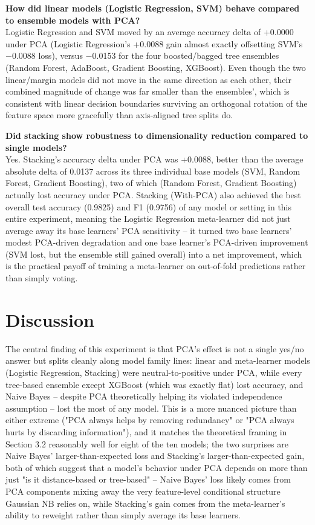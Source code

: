 \documentclass[11pt,a4paper]{article}
\begin{document}
\textbf{How did linear models (Logistic Regression, SVM) behave compared to ensemble models with PCA?}\\
Logistic Regression and SVM moved by an average accuracy delta of +0.0000 under PCA (Logistic Regression's +0.0088 gain almost exactly offsetting SVM's $-$0.0088 loss), versus $-$0.0153 for the four boosted/bagged tree ensembles (Random Forest, AdaBoost, Gradient Boosting, XGBoost). Even though the two linear/margin models did not move in the same direction as each other, their combined magnitude of change was far smaller than the ensembles', which is consistent with linear decision boundaries surviving an orthogonal rotation of the feature space more gracefully than axis-aligned tree splits do.

\textbf{Did stacking show robustness to dimensionality reduction compared to single models?}\\
Yes. Stacking's accuracy delta under PCA was +0.0088, better than the average absolute delta of 0.0137 across its three individual base models (SVM, Random Forest, Gradient Boosting), two of which (Random Forest, Gradient Boosting) actually lost accuracy under PCA. Stacking (With-PCA) also achieved the best overall test accuracy (0.9825) and F1 (0.9756) of any model or setting in this entire experiment, meaning the Logistic Regression meta-learner did not just average away its base learners' PCA sensitivity -- it turned two base learners' modest PCA-driven degradation and one base learner's PCA-driven improvement (SVM lost, but the ensemble still gained overall) into a net improvement, which is the practical payoff of training a meta-learner on out-of-fold predictions rather than simply voting.

\section{Discussion}
The central finding of this experiment is that PCA's effect is not a single yes/no answer but splits cleanly along model family lines: linear and meta-learner models (Logistic Regression, Stacking) were neutral-to-positive under PCA, while every tree-based ensemble except XGBoost (which was exactly flat) lost accuracy, and Naive Bayes -- despite PCA theoretically helping its violated independence assumption -- lost the most of any model. This is a more nuanced picture than either extreme ("PCA always helps by removing redundancy" or "PCA always hurts by discarding information"), and it matches the theoretical framing in Section 3.2 reasonably well for eight of the ten models; the two surprises are Naive Bayes' larger-than-expected loss and Stacking's larger-than-expected gain, both of which suggest that a model's behavior under PCA depends on more than just "is it distance-based or tree-based" -- Naive Bayes' loss likely comes from PCA components mixing away the very feature-level conditional structure Gaussian NB relies on, while Stacking's gain comes from the meta-learner's ability to reweight rather than simply average its base learners.
\end{document}
